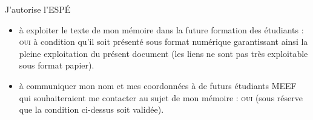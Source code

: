 \documentclass[french]{report}
\begin{document}
J'autorise l'ESP\'E
\begin{itemize}
\item à exploiter le texte de mon mémoire dans la future formation des
  étudiants : \textsc{oui} à condition qu'il soit présenté sous format
  numérique garantissant ainsi la pleine exploitation du présent
  document (les liens ne sont pas très exploitable sous format
  papier).
\item à communiquer mon nom et mes coordonnées à de futurs étudiants
  MEEF qui souhaiteraient me contacter au sujet de mon mémoire :
  \textsc{oui} (sous réserve que la condition ci-dessus soit validée).
\end{itemize}

%



%

%
\end{document}
